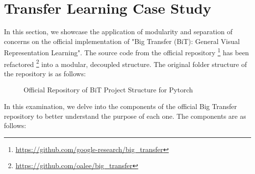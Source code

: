 \section{Transfer Learning Case Study}\label{transfer-study}


In this section, we showcase the application of modularity and separation of concerns on the official implementation of "Big Transfer (BiT): General Visual Representation Learning"\cite{transferlearning}. The source code from the official repository \footnote{\url{https://github.com/google-research/big_transfer}} has been refactored \footnote{\url{https://github.com/oalee/big_transfer}} into a modular, decoupled structure.  The original folder structure of the repository is as follows:


\begin{figure}
\centering
{}
\caption{
Official Repository of BiT Project Structure for Pytorch
}
\end{figure}



\vspace{0.4em}
In this examination, we delve into the components of the official Big Transfer repository to better understand the purpose of each one. The components are as follows:

